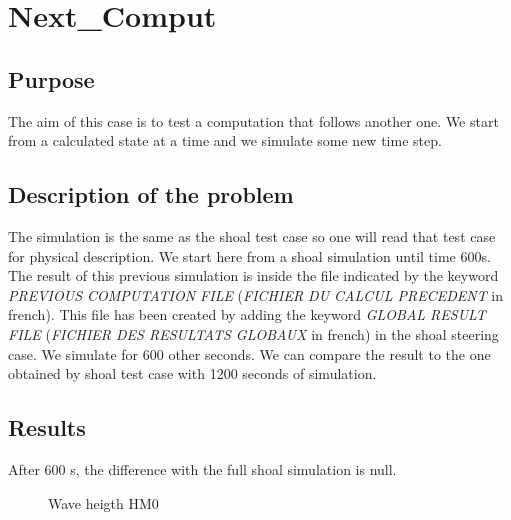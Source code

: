 \chapter{Next\_Comput}

\section{Purpose}
%
The aim of this case is to test a computation that follows another one. We start from a calculated state at a time and we simulate some new time step.
%
\section{Description of the problem}
%
The simulation is the same as the shoal test case so one will read that test case for physical description. We start here from a shoal simulation until time 600s. The result of this previous simulation is inside the file indicated by the keyword {\it PREVIOUS COMPUTATION FILE} ({\it FICHIER DU CALCUL PRECEDENT} in french). This file has been created by adding the keyword  {\it GLOBAL RESULT FILE} ({\it FICHIER DES RESULTATS GLOBAUX} in french) in the shoal steering case.
We simulate for 600 other seconds. We can compare the result to the one obtained by shoal test case with 1200 seconds of simulation.

\section{Results}
After 600 s, the difference with the full shoal simulation is null.
\begin{figure} [!h]
\centering
{}
 \caption{Wave heigth HM0}
\label{resnextcomp}
\end{figure}
